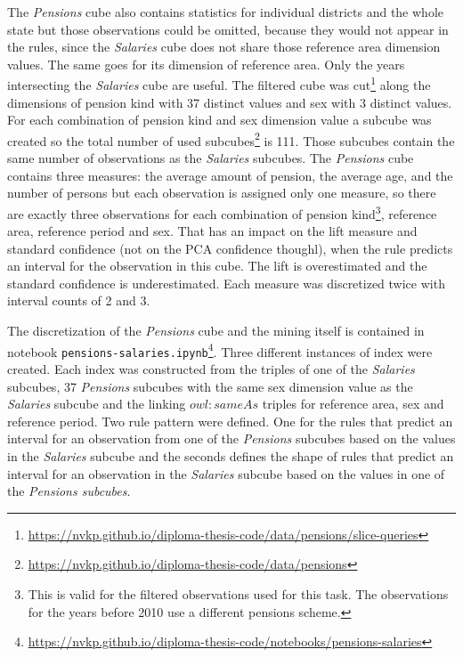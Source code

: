 The \textit{Pensions} cube also contains statistics for individual districts and the whole state but those observations could be omitted, because they would not appear in the rules, since the \textit{Salaries} cube does not share those reference area dimension values. The same goes for its dimension of reference area. Only the years intersecting the \textit{Salaries} cube are useful. The filtered cube was cut\footnote{\href{https://nvkp.github.io/diploma-thesis-code/data/pensions/slice-queries}{https://nvkp.github.io/diploma-thesis-code/data/pensions/slice-queries}} along the dimensions of pension kind with 37 distinct values and sex with 3 distinct values. For each combination of pension kind and sex dimension value a subcube was created so the total number of used subcubes\footnote{\href{https://nvkp.github.io/diploma-thesis-code/data/pensions}{https://nvkp.github.io/diploma-thesis-code/data/pensions}} is 111. Those subcubes contain the same number of observations as the \textit{Salaries} subcubes. The \textit{Pensions} cube contains three measures: the average amount of pension, the average age, and the number of persons but each observation is assigned only one measure, so there are exactly three observations for each combination of pension kind\footnote{This is valid for the filtered observations used for this task. The observations for the years before 2010 use a different pensions scheme.}, reference area, reference period and sex. That has an impact on the lift measure and standard confidence (not on the PCA confidence thoughl), when the rule predicts an interval for the observation in this cube. The lift is overestimated and the standard confidence is underestimated. Each measure was discretized twice with interval counts of 2 and 3.

The discretization of the \textit{Pensions} cube and the mining itself is contained in notebook \verb|pensions-salaries.ipynb|\footnote{\href{https://nvkp.github.io/diploma-thesis-code/notebooks/pensions-salaries}{https://nvkp.github.io/diploma-thesis-code/notebooks/pensions-salaries}}. Three different instances of index were created. Each index was constructed from the triples of one of the \textit{Salaries} subcubes, 37 \textit{Pensions} subcubes with the same sex dimension value as the \textit{Salaries} subcube and the linking $owl:sameAs$ triples for reference area, sex and reference period. Two rule pattern were defined. One for the rules that predict an interval for an observation from one of the \textit{Pensions} subcubes based on the values in the \textit{Salaries} subcube and the seconds defines the shape of rules that predict an interval for an observation in the \textit{Salaries} subcube based on the values in one of the \textit{Pensions subcubes}.

